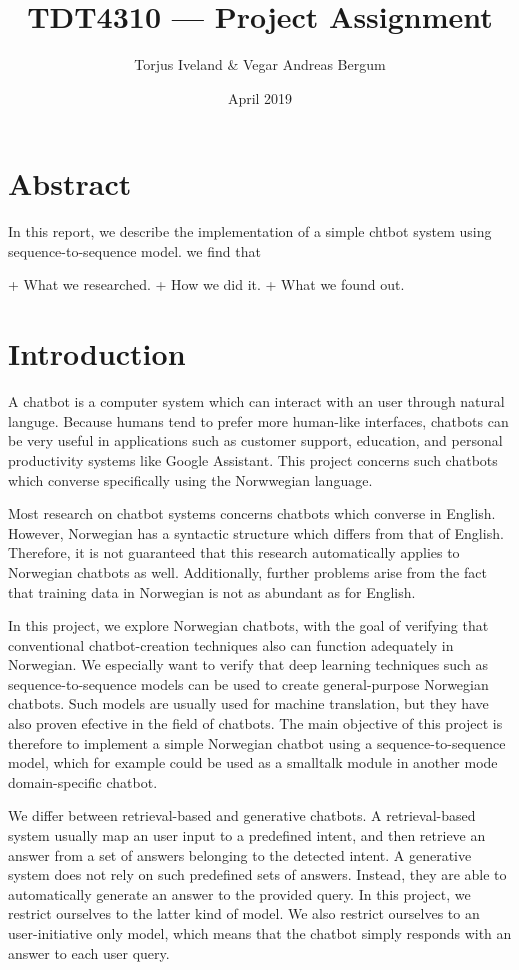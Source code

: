 \documentclass{article}
\title{TDT4310 --- Project Assignment}
\author{Torjus Iveland \& Vegar Andreas Bergum}
\date{April 2019}
\begin{document}
\maketitle

\section{Abstract}

In this report, we describe the implementation of a simple chtbot system
using sequence-to-sequence model. we find that

+ What we researched.
+ How we did it.
+ What we found out.

\section{Introduction}

A chatbot is a computer system which can interact with an user through natural
languge. Because humans tend to prefer more human-like interfaces, chatbots can
be very useful in applications
such as customer support, education, and personal productivity systems like
Google Assistant.  This project concerns such chatbots which converse
specifically using the Norwwegian language.

Most research on chatbot systems concerns chatbots which converse in English.
However, Norwegian has a syntactic structure which differs from that of
English. Therefore, it is not guaranteed that this research automatically
applies to Norwegian chatbots as well. Additionally, further problems arise
from the fact that training data in Norwegian is not as abundant as for
English.

In this project, we explore Norwegian chatbots, with the goal of verifying that
conventional chatbot-creation techniques also can function adequately in
Norwegian. We especially want to verify that deep learning techniques such as
sequence-to-sequence models \cite{Cho2014} can be used to create
general-purpose Norwegian chatbots. Such models are usually used for machine
translation, but they have also proven efective in the field of chatbots. The
main objective of this project is therefore to implement a simple Norwegian
chatbot using a sequence-to-sequence model, which for example could be used as
a smalltalk module in another mode domain-specific chatbot.

We differ between retrieval-based and generative chatbots. A retrieval-based
system usually map an user input to a predefined intent, and then retrieve an
answer from a set of answers belonging to the detected intent. A generative
system does not rely on such predefined sets of answers.  Instead, they are
able to automatically generate an answer to the provided query. In this
project, we restrict ourselves to the latter kind of model. We also restrict
ourselves to an user-initiative only model, which means that the chatbot simply
responds with an answer to each user query.
\end{document}
